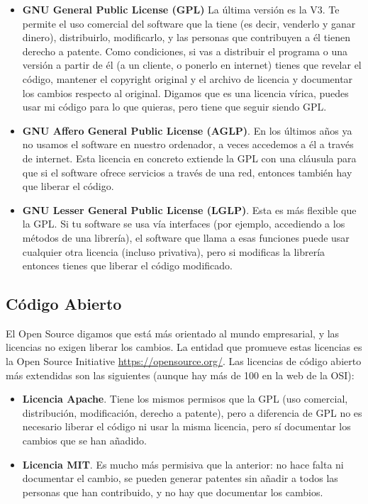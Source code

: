 \begin{itemize}

\item \textbf{GNU General Public License (GPL)} La última versión es la V3. Te permite el uso comercial del software que la tiene (es decir, venderlo y ganar dinero), distribuirlo, modificarlo, y las personas que contribuyen a él tienen derecho a patente. Como condiciones, si vas a distribuir el programa o una versión a partir de él (a un cliente, o ponerlo en internet) tienes que revelar el código, mantener el copyright original y el archivo de licencia y documentar los cambios respecto al original. Digamos que es una licencia vírica, puedes usar mi código para lo que quieras, pero tiene que seguir siendo GPL.

\item \textbf{GNU Affero General Public License (AGLP)}. En los últimos años ya no usamos el software en nuestro ordenador, a veces accedemos a él a través de internet. Esta licencia en concreto extiende la GPL con una cláusula para que si el software ofrece servicios a través de una red, entonces también hay que liberar el código.

\item \textbf{GNU Lesser General Public License (LGLP)}. Esta es más flexible que la GPL. Si tu software se usa vía interfaces (por ejemplo, accediendo a los métodos de una librería), el software que llama a esas funciones puede usar cualquier otra licencia (incluso privativa), pero si modificas la librería entonces tienes que liberar el código modificado.

\end{itemize}

\subsection{Código Abierto}
El Open Source digamos que está más orientado al mundo empresarial, y las licencias no exigen liberar los cambios. La entidad que promueve estas licencias es la Open Source Initiative \url{https://opensource.org/}. Las licencias de código abierto más extendidas son las siguientes (aunque hay más de 100 en la web de la OSI):

\begin{itemize}
   
\item \textbf{Licencia Apache}. Tiene los mismos permisos que la GPL (uso comercial, distribución, modificación, derecho a patente), pero a diferencia de GPL no es necesario liberar el código ni usar la misma licencia, pero sí documentar los cambios que se han añadido.

\item \textbf{Licencia MIT}. Es mucho más permisiva que la anterior: no hace falta ni documentar el cambio, se pueden generar patentes sin añadir a todos las personas que han contribuido, y no hay que documentar los cambios.

\end{itemize}

